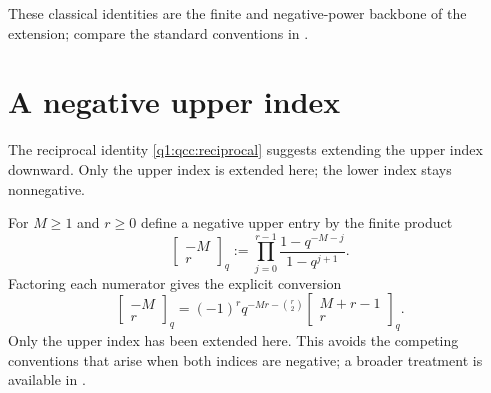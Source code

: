 \documentclass[11pt,a4paper,oneside,openany]{book}
\theoremstyle{definition}
\theoremstyle{remark}
\newcommand{\GB}[3][q]{\begin{bmatrix}#2\\#3\end{bmatrix}_{#1}}
\newcommand{\qb}[2]{\GB{#1}{#2}}
\begin{document}
These classical identities are the finite and negative-power backbone of the
extension; compare the standard conventions in \cite{dlmf172,dlmf175}.


\section{A negative upper index}
\label{q2:sec:negative}
The reciprocal identity \eqref{q1:qcc:reciprocal} suggests extending the
upper index downward. Only the upper index is extended here; the lower index
stays nonnegative.


For $M\ge1$ and $r\ge0$ define a negative upper entry by the finite product
\[
 \qb{-M}r:=\prod_{j=0}^{r-1}\frac{1-q^{-M-j}}{1-q^{j+1}}.
\]
Factoring each numerator gives the explicit conversion
\begin{equation}\label{q2:eq:negative-upper}
 \qb{-M}r=(-1)^r q^{-Mr-\binom r2}\qb{M+r-1}r.
\end{equation}
Only the upper index has been extended here. This avoids the competing
conventions that arise when both indices are negative; a broader treatment is
available in \cite{formichella}.

\end{document}
